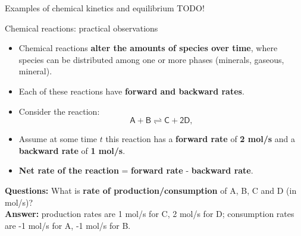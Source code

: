 \begin{frame}{Examples of chemical kinetics and equilibrium}
%
TODO!
\end{frame}
%
%
\begin{frame}{Chemical reactions: practical observations}
\begin{itemize}
\item Chemical reactions \textbf{alter the amounts of species over time}, where species can be distributed among one or more phases (minerals, gaseous, mineral).
\item Each of these reactions have \textbf{forward and backward rates}. 
\item Consider the reaction:
\[
\mathsf{A+B\rightleftharpoons C+2D,}
\]
\item Assume at some time $t$ this reaction has a \textbf{forward rate}
of \alert{\textbf{2 mol/s}} and a \textbf{backward rate}
of \alert{\textbf{1 mol/s}}.
\item \alert{\textbf{Net rate of the reaction}} = \textbf{forward rate} - \textbf{backward rate}. 
\end{itemize}
\hiddenpause


\alert{\textbf{Questions:}}  What is \textbf{rate of production\slash consumption}
of A, B, C and D (in mol/s)? \\
\textbf{Answer:} production rates are 1 mol/s for C, 2 mol/s for D; consumption rates are -1 mol/s for A, -1 mol/s for B. 
\end{frame}

